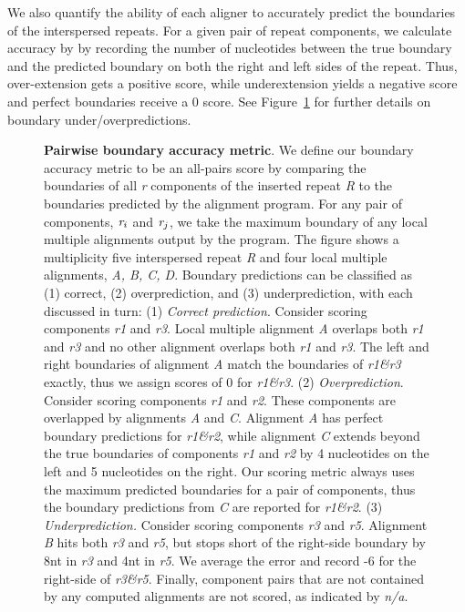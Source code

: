 \documentclass{llncs}
\begin{document}
We also quantify the ability of each aligner to accurately predict the
boundaries of the interspersed repeats.  For a given pair of repeat components, we calculate accuracy by
by recording the number of nucleotides between the true boundary and the predicted boundary
on both the right and left sides of the repeat.  Thus, over-extension gets a positive score, while underextension
yields a negative score and perfect boundaries receive a 0 score. See Figure~\ref{fig-overunder} for
further details on boundary under/overpredictions.

\begin{figure}[t]
\centering
{}
\caption{\textbf{Pairwise boundary accuracy metric}. We define our boundary accuracy metric to be an all-pairs score by comparing the boundaries of all \emph{r} components of the inserted repeat \emph{R} to the boundaries predicted by the alignment program. For any pair of components, $\emph{r}_{i}$ and $\emph{r}_{j}$, we take the maximum boundary of any local multiple alignments output by the program. The figure shows a multiplicity five interspersed repeat \emph{R} and four local multiple alignments, \emph{A, B, C, D}.  Boundary predictions can be classified as (1) correct, (2) overprediction, and (3) underprediction, with each discussed in turn: (1) \emph{Correct prediction}. Consider scoring components \emph{r1} and \emph{r3}.  Local multiple alignment \emph{A} overlaps both \emph{r1} and \emph{r3} and no other alignment overlaps both \emph{r1} and \emph{r3}.  The left and right boundaries of alignment \emph{A} match the boundaries of \emph{r1\&r3} exactly, thus we assign scores of 0 for \emph{r1\&r3}.  (2) \emph{Overprediction}. Consider scoring components \emph{r1} and \emph{r2}.  These components are overlapped by alignments \emph{A} and \emph{C}.  Alignment \emph{A} has perfect boundary predictions for \emph{r1\&r2}, while alignment \emph{C} extends beyond the true boundaries of components \emph{r1} and \emph{r2} by 4 nucleotides on the left and 5 nucleotides on the right.  Our scoring metric always uses the maximum predicted boundaries for a pair of components, thus the boundary predictions from \emph{C} are reported for \emph{r1\&r2}. (3) \emph{Underprediction.}  Consider scoring components \emph{r3} and \emph{r5}.  Alignment \emph{B} hits both \emph{r3} and \emph{r5}, but stops short of the right-side boundary by 8nt in \emph{r3} and 4nt in \emph{r5}.  We average the error and record -6 for the right-side of \emph{r3\&r5}.
Finally, component pairs that are not contained by any computed alignments are not scored, as indicated by \emph{n/a}.}
\label{fig-overunder}
\end{figure}
\end{document}

